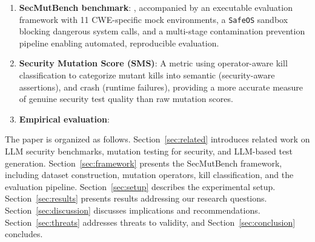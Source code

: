 \documentclass[sigconf,anonymous,review]{acmart}
\begin{document}
\begin{enumerate}
    \item \textbf{SecMutBench benchmark}: , accompanied by an executable evaluation framework with 11 CWE-specific mock environments, a \texttt{SafeOS} sandbox blocking dangerous system calls, and a multi-stage contamination prevention pipeline enabling automated, reproducible evaluation.

    \item \textbf{Security Mutation Score (SMS)}: A metric using operator-aware kill classification to categorize mutant kills into semantic (security-aware assertions),  and crash (runtime failures), providing a more accurate measure of genuine security test quality than raw mutation scores.

    \item \textbf{Empirical evaluation}: 
\end{enumerate}

The paper is organized as follows. Section~\ref{sec:related} introduces related work on LLM security benchmarks, mutation testing for security, and LLM-based test generation. Section~\ref{sec:framework} presents the SecMutBench framework, including dataset construction, mutation operators, kill classification, and the evaluation pipeline. Section~\ref{sec:setup} describes the experimental setup. Section~\ref{sec:results} presents results addressing our  research questions. Section~\ref{sec:discussion} discusses implications and recommendations. Section~\ref{sec:threats} addresses threats to validity, and Section~\ref{sec:conclusion} concludes.

\end{document}
